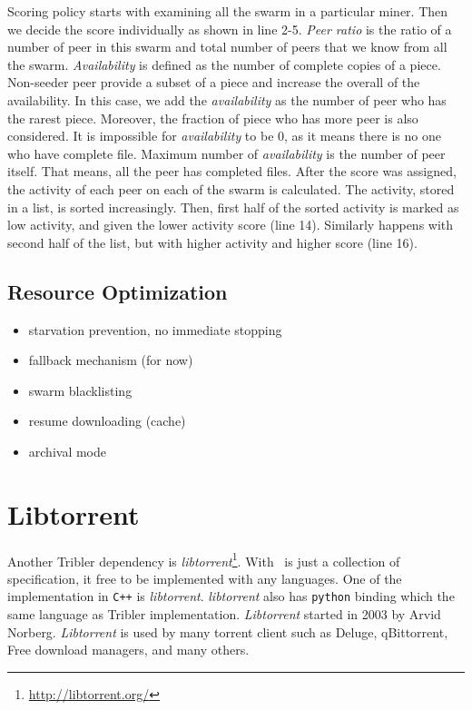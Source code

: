 Scoring policy starts with examining all the swarm in a particular miner. Then we decide the score individually as shown in line 2-5. \textit{Peer ratio} is the ratio of a number of peer in this swarm and total number of peers that we know from all the swarm. \textit{Availability} is defined as the number of complete copies of a piece. Non-seeder peer provide a subset of a piece and increase the overall of the availability. In this case, we add the \textit{availability} as the number of peer who has the rarest piece. Moreover, the fraction of piece who has more peer is also considered. It is impossible for \textit{availability} to be 0, as it means there is no one who have complete file. Maximum number of \textit{availability} is the number of peer itself. That means, all the peer has completed files. After the score was assigned, the activity of each peer on each of the swarm is calculated. The activity, stored in a list, is sorted increasingly. Then, first half of the sorted activity is marked as low activity, and given the lower activity score (line 14). Similarly happens with second half of the list, but with higher activity and higher score (line 16).

\subsection{Resource Optimization}
\begin{itemize}
	\item starvation prevention, no immediate stopping
	 \item fallback mechanism (for now)
\item 	 swarm blacklisting
\item 	 resume downloading (cache)
\item 	 archival mode
\end{itemize}


\section{Libtorrent}
\label{section:libtorrent}
Another Tribler dependency is \textit{libtorrent}\footnote{\url{http://libtorrent.org/}}. With \bt~is just a collection of specification, it free to be implemented with any languages. One of the implementation in \texttt{C++} is \textit{libtorrent}. \textit{libtorrent} also has \texttt{python} binding which the same language as Tribler implementation. \textit{Libtorrent} started in 2003 by Arvid Norberg. \textit{Libtorrent} is used by many torrent client such as Deluge, qBittorrent, Free download managers, and many others.

